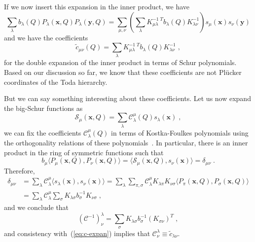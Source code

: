 \documentclass[a4paper,11pt]{amsart}
\begin{document}
If we now insert this expansion in the inner product, we have 
\begin{equation}
    \sum_\lambda b_\lambda(Q) P_\lambda(\bm{x}, Q) P_\lambda(\bm{y}, Q) = 
    \sum_{\mu,\nu} \left(\sum_\lambda K_{\mu \lambda}^{-1 \; T} b_\lambda(Q)  K_{\lambda \nu}^{-1} \right)
    s_{\mu}(\bm{x}) s_{\nu}(\bm{y}) 
\end{equation}
and we have the coefficients 
\begin{equation}
\label{eq:c-expan}
 \tilde{c}_{\mu\nu}(Q) = \sum_\lambda K_{\mu \lambda}^{-1 \; T} b_\lambda(Q)  K_{\lambda \nu}^{-1} \; ,
\end{equation}
for the double expansion of the inner product in terms of Schur
polynomials. Based on our discussion so far, we know that these
coefficients are not Plücker coordinates of the Toda hierarchy.

But we can say something interesting about these coefficients. Let us
now expand the big-Schur functions as
\begin{equation}
\label{eq:kf-exp}
  \mathcal{S}_\mu(\bm{x}, Q) = \sum_{\lambda} \mathcal{C}^{\mu}_\lambda(Q) s_\lambda(\bm{x})\; ,
\end{equation}
we can fix the coefficients \(\mathcal{C}_\lambda^\mu(Q)\) in terms of
Kostka-Foulkes polynomials using the orthogonality relations of these
polynomials~\cite{Macdonald:1998}. In particular, there is an inner
product in the ring of symmetric functions such that
\begin{equation}
  b_\mu \langle P_\mu(\bm{x}, Q), P_\nu(\bm{x}, Q)\rangle = \langle
  \mathcal{S}_\mu(\bm{x}, Q), s_\nu(\bm{x})\rangle = \delta_{\mu\nu}\; .
\end{equation}
Therefore,
\begin{equation}
  \begin{split}
\delta_{\mu\nu} & = \sum_\lambda \mathcal{C}_\lambda^\mu \langle s_\lambda(\bm{x}), s_\nu(\bm{x})\rangle
 = \sum_\lambda \sum_{\pi, \sigma} \mathcal{C}_\lambda^\mu K_{\lambda \pi} K_{\nu \sigma}
\langle P_{\pi}(\bm{x}, Q), P_{\sigma}(\bm{x}, Q)\rangle \\ 
& = \sum_\lambda \mathcal{C}_\lambda^\mu \sum_{\sigma}K_{\lambda \sigma} b_{\sigma}^{-1} K_{\nu \sigma}\; ,
  \end{split}
\end{equation}
and we conclude that 
\begin{equation}
\label{eq:indices}
(\mathcal{C}^{-1})^\lambda_\nu = \sum_\sigma K_{\lambda\sigma} b^{-1}_\sigma (K_{\sigma\nu})^T\; ,
\end{equation}
and consistency with~(\ref{eq:c-expan}) implies that
\(\mathcal{C}^\lambda_\nu \equiv \tilde{c}_{\lambda\nu}\).
\end{document}
